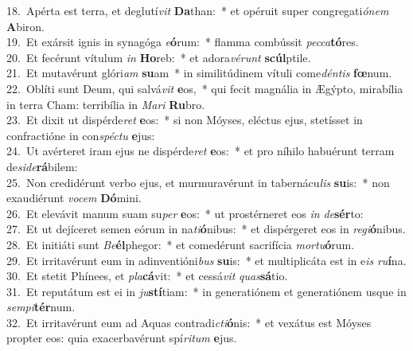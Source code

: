 {18.~}Apérta est terra, et deglutí\textit{vit} \textbf{Da}than:~* et opéruit super congregati\textit{ó}\textit{nem} \textbf{A}biron.\\
{19.~}Et exársit ignis in synagóga \textit{e}\textbf{ó}rum:~* flamma combússit \textit{pec}\textit{ca}\textbf{tó}res.\\
{20.~}Et fecérunt vítulum \textit{in} \textbf{Ho}reb:~* et adora\textit{vé}\textit{runt} \textbf{scúl}ptile.\\
{21.~}Et mutavérunt glóri\textit{am} \textbf{su}am~* in similitúdinem vítuli come\textit{dén}\textit{tis} \textbf{fœ}num.\\
{22.~}Oblíti sunt Deum, qui salvá\textit{vit} \textbf{e}os,~* qui fecit magnália in Ægýpto, mirabília in terra Cham: terribília in \textit{Ma}\textit{ri} \textbf{Ru}bro.\\
{23.~}Et dixit ut dispérde\textit{ret} \textbf{e}os:~* si non Móyses, eléctus ejus, stetísset in confractióne in con\textit{spé}\textit{ctu} \textbf{e}jus:\\
{24.~}Ut avérteret iram ejus ne dispérde\textit{ret} \textbf{e}os:~* et pro níhilo habuérunt terram de\textit{si}\textit{de}\textbf{rá}bilem:\\
{25.~}Non credidérunt verbo ejus, et murmuravérunt in tabernácu\textit{lis} \textbf{su}is:~* non exaudiérunt \textit{vo}\textit{cem} \textbf{Dó}mini.\\
{26.~}Et elevávit manum suam su\textit{per} \textbf{e}os:~* ut prostérneret eos \textit{in} \textit{de}\textbf{sér}to:\\
{27.~}Et ut dejíceret semen eórum in na\textit{ti}\textbf{ó}nibus:~* et dispérgeret eos in \textit{re}\textit{gi}\textbf{ó}nibus.\\
{28.~}Et initiáti sunt \textit{Be}\textbf{él}phegor:~* et comedérunt sacrifícia \textit{mor}\textit{tu}\textbf{ó}rum.\\
{29.~}Et irritavérunt eum in adinventióni\textit{bus} \textbf{su}is:~* et multiplicáta est in e\textit{is} \textit{ru}\textbf{í}na.\\
{30.~}Et stetit Phínees, et \textit{pla}\textbf{cá}vit:~* et cessá\textit{vit} \textit{quas}\textbf{sá}tio.\\
{31.~}Et reputátum est ei in \textit{ju}\textbf{stí}tiam:~* in generatiónem et generatiónem usque in \textit{sem}\textit{pi}\textbf{tér}num.\\
{32.~}Et irritavérunt eum ad Aquas contradi\textit{cti}\textbf{ó}nis:~* et vexátus est Móyses propter eos: quia exacerbavérunt spí\textit{ri}\textit{tum} \textbf{e}jus.\\
